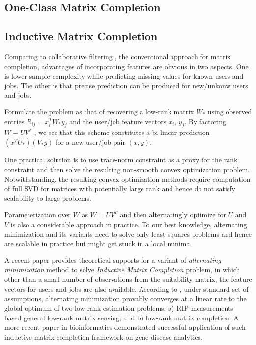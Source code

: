 \documentclass{article} %
\begin{document}
\subsection{One-Class Matrix Completion}


\subsection{Inductive Matrix Completion}
Comparing to collaborative filtering
, the conventional approach for matrix completion, advantages of incorporating
features are obvious in two aspects. One is lower sample complexity while
predicting missing values for known users and jobs.   The other is that precise
prediction can be produced for new/unkonw users and jobs. 

Formulate the problem as that of recovering a low-rank matrix $W_*$ using
observed entries $R_{ij} = x_i^T W_{*} y_j$ and the user/job feature vectors $x_i$, $y_j$. By
factoring $W = U V^T$ , we see that this scheme constitutes a bi-linear
prediction $(x^T U_{*})(V_{*} y)$ for a new user/job pair $(x, y)$.

One practical solution is to use trace-norm constraint as a proxy for the rank
constraint and then solve the resulting non-smooth convex optimization
problem. Notwithstanding, the resulting convex optimization methods require
computation of full SVD for matrices with potentially large rank and hence do
not satisfy scalability to large problems.

Parameterization over $W$ as $W = U V^T$ and then alternatingly optimize for
$U$ and $V$ is also a considerable approach in practice. To our best
knowledge, alternating minimization and its variants need to solve only least
squares problems and hence are scalable in practice but might get stuck in a
local minima.

A recent paper \cite{jain2013provable} provides theoretical
supports for a variant of {\it alternating minimization} method to solve
{\it Inductive Matrix Completion} problem, in which other than a small number
of observations from the suitability matrix, the feature vectors for users and
jobs are also available.
According to \cite{jain2013provable}, under standard set of assumptions,
alternating minimization provably converges at a linear rate to the global
optimum of two low-rank estimation problems: a) RIP measurements based general
low-rank matrix sensing, and b) low-rank matrix completion. A more recent
paper \cite{natarajan2014inductive} in bioinformatics demonstrated successful
application of such inductive matrix completion
framework on gene-disease analytics.
\end{document}
